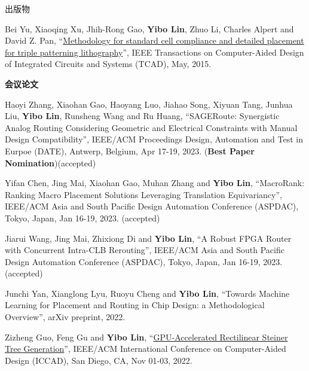 \begin{rSection}{出版物}
\begin{description}[font=\normalfont, rightmargin=2em]
\item[{[J1]}]{
        Bei Yu, Xiaoqing Xu, Jhih-Rong Gao, \textbf{Yibo Lin}, Zhuo Li, Charles Alpert and David Z. Pan, 
    ``\href{https://doi.org/10.1109/TCAD.2015.2401571}{Methodology for standard cell compliance and detailed placement for triple patterning lithography}'', 
    IEEE Transactions on Computer-Aided Design of Integrated Circuits and Systems (TCAD), May, 2015.
    
}
            

\end{description}
    

\textbf{会议论文}
        

\begin{description}[font=\normalfont, rightmargin=2em]
    

\item[{[C73]}]{
        Haoyi Zhang, Xiaohan Gao, Haoyang Luo, Jiahao Song, Xiyuan Tang, Junhua Liu, \textbf{Yibo Lin}, Runsheng Wang and Ru Huang, 
    ``SAGERoute: Synergistic Analog Routing Considering Geometric and Electrical Constraints with Manual Design Compatibility'', 
    IEEE/ACM Proceedings Design, Automation and Test in Eurpoe (DATE), Antwerp, Belgium, Apr 17-19, 2023.
    (\textbf{Best Paper Nomination})(accepted)
}
            

\item[{[C72]}]{
        Yifan Chen, Jing Mai, Xiaohan Gao, Muhan Zhang and \textbf{Yibo Lin}, 
    ``MacroRank: Ranking Macro Placement Solutions Leveraging Translation Equivariancy'', 
    IEEE/ACM Asia and South Pacific Design Automation Conference (ASPDAC), Tokyo, Japan, Jan 16-19, 2023.
    (accepted)
}
            

\item[{[C71]}]{
        Jiarui Wang, Jing Mai, Zhixiong Di and \textbf{Yibo Lin}, 
    ``A Robust FPGA Router with Concurrent Intra-CLB Rerouting'', 
    IEEE/ACM Asia and South Pacific Design Automation Conference (ASPDAC), Tokyo, Japan, Jan 16-19, 2023.
    (accepted)
}
            

\item[{[C70]}]{
        Junchi Yan, Xianglong Lyu, Ruoyu Cheng and \textbf{Yibo Lin}, 
    ``Towards Machine Learning for Placement and Routing in Chip Design: a Methodological Overview'', 
    arXiv preprint, 2022.
    
}
            

\item[{[C69]}]{
        Zizheng Guo, Feng Gu and \textbf{Yibo Lin}, 
    ``\href{https://doi.org/10.1145/3508352.3549434}{GPU-Accelerated Rectilinear Steiner Tree Generation}'', 
    IEEE/ACM International Conference on Computer-Aided Design (ICCAD), San Diego, CA, Nov 01-03, 2022.
    
}
\end{description}
\end{rSection}
